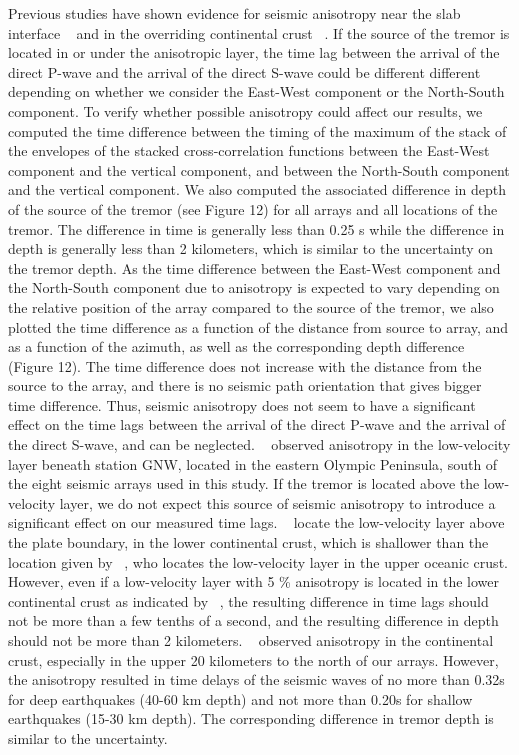 \documentclass[draft]{agujournal2019}
\begin{document}
Previous studies have shown evidence for seismic anisotropy near the slab interface ~\cite{NIK_2009} and in the overriding continental crust ~\cite{CAS_1996}. If the source of the tremor is located in or under the anisotropic layer, the time lag between the arrival of the direct P-wave and the arrival of the direct S-wave could be different different depending on whether we consider the East-West component or the North-South component. To verify whether possible anisotropy could affect our results, we computed the time difference between the timing of the maximum of the stack of the envelopes of the stacked cross-correlation functions between the East-West component and the vertical component, and between the North-South component and the vertical component. We also computed the associated difference in depth of the source of the tremor (see Figure 12) for all arrays and all locations of the tremor. The difference in time is generally less than 0.25 s while the difference in depth is generally less than 2 kilometers, which is similar to the uncertainty on the tremor depth. As the time difference between the East-West component and the North-South component due to anisotropy is expected to vary depending on the relative position of the array compared to the source of the tremor, we also plotted the time difference as a function of the distance from source to array, and as a function of the azimuth, as well as the corresponding depth difference (Figure 12). The time difference does not increase with the distance from the source to the array, and there is no seismic path orientation that gives bigger time difference. Thus, seismic anisotropy does not seem to have a significant effect on the time lags between the arrival of the direct P-wave and the arrival of the direct S-wave, and can be neglected. ~ observed anisotropy in the low-velocity layer beneath station GNW, located in the eastern Olympic Peninsula, south of the eight seismic arrays used in this study. If the tremor is located above the low-velocity layer, we do not expect this source of seismic anisotropy to introduce a significant effect on our measured time lags. ~ locate the low-velocity layer above the plate boundary, in the lower continental crust, which is shallower than the location given by ~, who locates the low-velocity layer in the upper oceanic crust. However, even if a low-velocity layer with 5 \% anisotropy is located in the lower continental crust as indicated by ~, the resulting difference in time lags should not be more than a few tenths of a second, and the resulting difference in depth should not be more than 2 kilometers. ~ observed anisotropy in the continental crust, especially in the upper 20 kilometers to the north of our arrays. However, the anisotropy resulted in time delays of the seismic waves of no more than 0.32s for deep earthquakes (40-60 km depth) and not more than 0.20s for shallow earthquakes (15-30 km depth). The corresponding difference in tremor depth is similar to the uncertainty.
\end{document}
